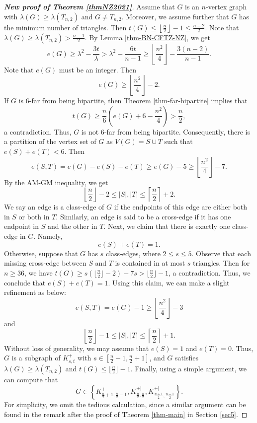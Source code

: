 \documentclass[11pt]{article}
\begin{document}
\begin{proof}[{\bf New proof of Theorem \ref{thmNZ2021}}]
Assume that $G$ is an $n$-vertex graph with $\lambda (G) \ge  
\lambda (T_{n,2})$ and $G\neq T_{n,2}$. 
Moreover, we assume further that $G$  has the minimum number of 
triangles. 
Then 
$  t(G)\le \left\lfloor \frac{n}{2}\right\rfloor -1\le \frac{n-2}{2}$.  
Note that  $\lambda (G)\ge \lambda (T_{n,2}) > \frac{n-1}{2}$. 
By Lemma \ref{thm-BN-CFTZ-NZ}, we get  
\[   e(G)\ge \lambda^2- \frac{3t}{\lambda} 
> \lambda^2 - \frac{6t}{n-1} \ge   
\left\lfloor \frac{n^2}{4} \right\rfloor - \frac{3(n-2)}{n-1} . \]  
Note that $e(G)$ must be an integer.  
Then 
\[ e(G)\ge \left\lfloor \frac{n^2}{4} \right\rfloor  -2. \] 
 If $G$ is  $6$-far from being bipartite, then Theorem \ref{thm-far-bipartite} implies that 
\[  t(G)\ge \frac{n}{6} \left( e(G) +6 - \frac{n^2}{4} \right) > \frac{n}{2}, \]  
 a contradiction. Thus, $G$ is not $6$-far from  being bipartite. Consequently, there is a partition of
the vertex set of $G$ as $V(G)=S\cup T$ such that $e(S)+e(T)< 6$. Then 
\[  e(S,T) = e(G) - e(S) - e(T)
\ge e(G) -5 \ge \left\lfloor \frac{n^2}{4} \right\rfloor -7. \]    
By the AM-GM inequality, we get 
\[  \left \lfloor \frac{n}{2} \right\rfloor -2 
\le |S|,|T| \le \left \lceil \frac{n}{2} \right\rceil +2. \] 
We say an edge is a class-edge of $G$ if the endpoints 
 of this edge are either both in $S$ or both in $T$. 
Similarly,  an edge is said to be a cross-edge 
 if it has one endpoint in $S$ and the other in $T$.  
Next, we claim that there is exactly one class-edge in $G$. Namely, 
\[ e(S) +e(T) =1. \]  
Otherwise, suppose  that $G$ has $s$ class-edges, where $2\le s\le 5$. 
Observe that each missing cross-edge between $S$ and $T$ 
is contained in at most $s$ triangles. Then for $n\ge 36$, 
we have $ t(G) \ge s ( \lfloor \frac{n}{2}\rfloor -2) - 7s > \lfloor \frac{n}{2}\rfloor -1$, 
a contradiction.  Thus, we conclude that 
$ e(S) + e(T)=1$.  
Using this claim, 
we can make a slight refinement as below:  
\[  e(S,T)= e(G)- 1 \ge \left\lfloor \frac{n^2}{4} \right\rfloor -3 \] 
and 
\[  \left \lfloor \frac{n}{2} \right\rfloor -1 
\le |S|,|T| \le \left \lceil \frac{n}{2} \right\rceil +1. \] 
Without loss of generality, we may assume that 
 $e(S)=1$ and $e(T)=0$. 
 Thus, $G$ is a subgraph of $K_{s,t}^+$ with  $s\in [\frac{n}{2} -1, \frac{n}{2} +1]$, and $G$ satisfies $\lambda (G)\ge \lambda (T_{n,2})$
and $t(G)\le \lfloor \frac{n}{2}\rfloor -1$. 
 Finally, using a simple argument, 
 we can compute that 
 \[ G\in \left\{ K_{\frac{n}{2}+1,\frac{n}{2}-1}^+,
K_{\frac{n}{2} ,  \frac{n}{2} }^{+|}, 
K_{ \frac{n+1}{2},\frac{n-1}{2}}^{+|} \right\}. \] 
For simplicity, we omit the tedious calculation, since a similar argument 
can be found in the remark after the proof of Theorem \ref{thm-main} in Section \ref{sec5}.
\end{proof}
\end{document}
